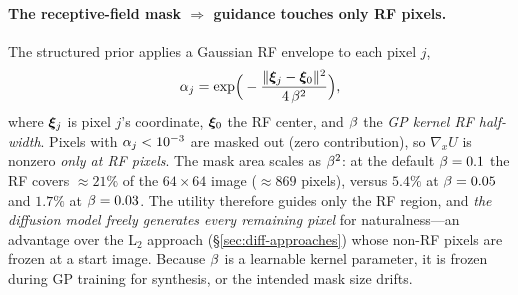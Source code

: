 \paragraph{The receptive-field mask $\Rightarrow$ guidance touches only RF pixels.}
The structured prior applies a Gaussian RF envelope to each pixel $j$,
\begin{equation}
\alpha_{j}=\exp\!\Big(-\frac{\lVert\bm{\xi}_{j}-\bm{\xi}_{0}\rVert^{2}}{4\,\beta^{2}}\Big),
\label{eq:rfmask}
\end{equation}
where $\bm{\xi}_{j}$ is pixel $j$'s coordinate, $\bm{\xi}_{0}$ the RF center, and $\beta$ the
\emph{GP kernel RF half-width}. Pixels with $\alpha_{j}<10^{-3}$ are masked out
(zero contribution), so $\nabla_{x}U$ is nonzero \emph{only at RF pixels}. The
mask area scales as $\beta^{2}$: at the default $\beta=0.1$ the RF covers
$\approx21\%$ of the $64\times64$ image ($\approx869$ pixels), versus $5.4\%$ at
$\beta=0.05$ and $1.7\%$ at $\beta=0.03$. The utility therefore guides only the RF
region, and \emph{the diffusion model freely generates every remaining pixel} for
naturalness---an advantage over the L$_{2}$ approach (\S\ref{sec:diff-approaches})
whose non-RF pixels are frozen at a start image. Because $\beta$ is a learnable
kernel parameter, it is frozen during GP training for synthesis, or the intended
mask size drifts.


